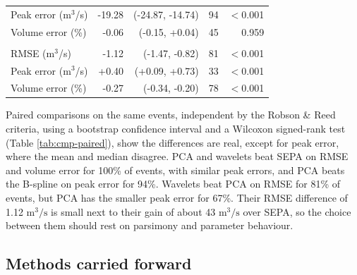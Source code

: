 \documentclass[
  11pt,
  a4paper]{article}
\begin{document}
\begin{table}[!h]
\begin{tabular}[t]{lrrrr}
\hspace{1em}Peak error (m$^3$/s) & -19.28 & (-24.87, -14.74) & 94 & $<$0.001\\
\hspace{1em}Volume error (\%) & -0.06 & (-0.15, +0.04) & 45 & 0.959\\
\addlinespace[0.3em]
\multicolumn{5}{l}{\textbf{Wavelets vs PCA}}\\
\hspace{1em}RMSE (m$^3$/s) & -1.12 & (-1.47, -0.82) & 81 & $<$0.001\\
\hspace{1em}Peak error (m$^3$/s) & +0.40 & (+0.09, +0.73) & 33 & $<$0.001\\
\hspace{1em}Volume error (\%) & -0.27 & (-0.34, -0.20) & 78 & $<$0.001\\
\bottomrule
\end{tabular}
\end{table}

Paired comparisons on the same events, independent by the Robson \& Reed criteria, using a bootstrap confidence interval and a Wilcoxon signed-rank test (Table \ref{tab:cmp-paired}), show the differences are real, except for peak error, where the mean and median disagree. PCA and wavelets beat SEPA on RMSE and volume error for 100\% of events, with similar peak errors, and PCA beats the B-spline on peak error for 94\%. Wavelets beat PCA on RMSE for 81\% of events, but PCA has the smaller peak error for 67\%. Their RMSE difference of 1.12 \(\text{m}^3/\text{s}\) is small next to their gain of about 43 \(\text{m}^3/\text{s}\) over SEPA, so the choice between them should rest on parsimony and parameter behaviour.

\subsection{Methods carried forward}\label{cmp-synthesis}
\end{document}
